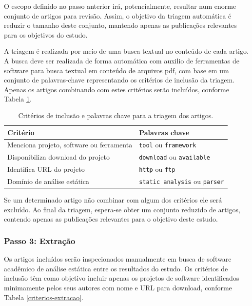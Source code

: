 O escopo definido no passo anterior irá, potencialmente, resultar num enorme
conjunto de artigos para revisão. Assim, o objetivo da triagem automática é reduzir o tamanho deste
conjunto, mantendo apenas as publicações relevantes para os objetivos do estudo.

A triagem é realizada por meio de uma busca textual no conteúdo de cada artigo. A
busca deve ser realizada de forma automática com auxilio de ferramentas de
software para busca textual em conteúdo de arquivos pdf, com base em um
conjunto de palavras-chave representando os critérios de inclusão da triagem.
Apenas os artigos combinando com estes critérios serão incluídos, conforme
Tabela \ref{criterios-triagem}.

\begin{table}[h]
\caption{Critérios de inclusão e palavras chave para a triagem dos artigos.}
\centering
\begin{tabular}{ l l }
  \hline
  Critério                                 & Palavras chave                        \\
  \hline
  Menciona projeto, software ou ferramenta & {\tt tool} ou {\tt framework}         \\
  Disponibiliza download do projeto        & {\tt download} ou {\tt available}     \\
  Identifica URL do projeto                & {\tt http} ou {\tt ftp}               \\
  Domínio de análise estática              & {\tt static analysis} ou {\tt parser} \\
  \hline
\end{tabular}
\label{criterios-triagem}
\end{table}

Se um determinado artigo não combinar com algum dos critérios ele será
excluído. Ao final da triagem, espera-se obter um conjunto reduzido
de artigos, contendo apenas as publicações relevantes para o objetivo
deste estudo.

\subsubsection{Passo 3: Extração}

Os artigos incluídos serão inspecionados manualmente em busca de software acadêmico de
análise estática entre os resultados do estudo. Os critérios de inclusão têm
como objetivo incluir apenas os projetos de software identificados minimamente
pelos seus autores com nome e URL para download, conforme Tabela
\ref{criterios-extracao}.

